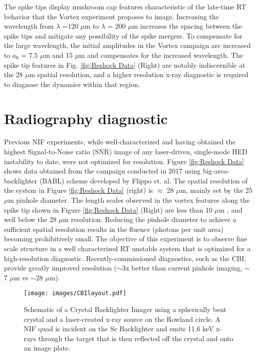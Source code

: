 \documentclass[%
 aip,
 amsmath,amssymb,
 reprint,
 floatfix
]{revtex4-1}
\begin{document}
 The spike tips display mushroom cap features characteristic of the late-time RT behavior that the Vortex experiment proposes to image. Increasing the wavelength from $\lambda$ =120 $\mu$m to $\lambda$ = 200 $\mu$m  increases the spacing between the spike tips and mitigate any possibility of the spike mergers.  To compensate for the large wavelength, the initial amplitudes in the Vortex campaign are increased to $a_{0}$ =  7.5 $\mu$m and 15 $\mu$m and compensates for the increased wavelength. The spike tip features in Fig. \ref{fig:Reshock Data} (Right) are notably indiscernible at the 28  $\mu$m spatial resolution, and a higher resolution x-ray diagnostic is required to diagnose the dynamics within that region.  
 


\section{Radiography diagnostic} Previous NIF experiments, while well-characterized and having obtained the highest  Signal-to-Noise ratio (SNR) image of any laser-driven, single-mode HED instability to date, were not optimized for resolution. \cite{Nagel:2017} Figure \ref{fig:Reshock Data} shows data obtained from the  campaign conducted in 2017 \cite{Nagel:2017} using big-area-backlighter (BABL) scheme developed by Flippo et. al.  \cite{flippo2014development}  The spatial resolution of the system in Figure \ref{fig:Reshock Data} (right) is $\approx$ 28 $\mu$m, mainly set by the 25 $\mu$m pinhole diameter. \cite{flippo2014development}  The length scales observed in the vortex features along the spike tip shown in Figure \ref{fig:Reshock Data} (Right)  are less than 10 $\mu$m , and well below the 28 $\mu$m resolution.  Reducing the pinhole diameter to achieve a sufficient spatial resolution results in the fluence (photons per unit area) becoming prohibitively small. \cite{DoZonePlate}   The objective of this experiment is to observe fine scale structure in a well characterized RT unstable system that is optimized for a high-resolution diagnostic. Recently-commissioned diagnostics, such as the CBI,  provide greatly improved resolution ($\sim$3x better than current pinhole imaging, $\sim$7 $\mu$m vs $\sim$28 $\mu$m). 



   \begin{figure}
 \center
  \texttt{[image: images/CBIlayout.pdf]}
  \caption{Schematic of a Crystal Backlighter Imager using a spherically bent crystal and a laser-created x-ray source on the Rowland circle. A NIF quad is incident on the Se Backlighter and emits 11.6 keV x-rays through the target that is then reflected off the crystal and onto an image plate. \cite{Hall:2019}}
  \label{fig:CBImodel}
\end{figure}
\end{document}
